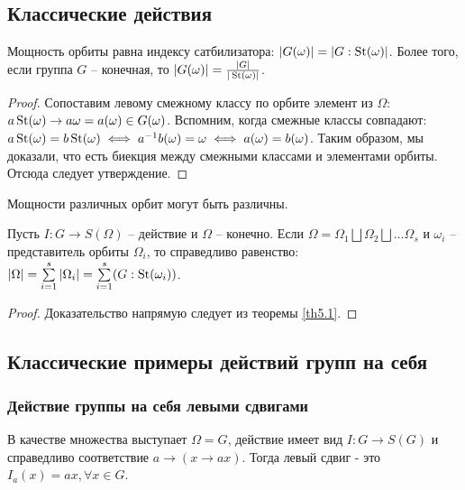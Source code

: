 \subsection{Классические действия}
\begin{theorem}
\label{th5.1}
    Мощность орбиты равна индексу сатбилизатора: $|G(\omega)| = |G: \operatorname{\text{St}}(\omega)|$. Более того, если группа $G$ -- конечная, то $|G(\omega)| = \frac{|G|}{|\operatorname{\text{St}}(\omega)|}$.
\end{theorem}

\begin{proof}
    Сопоставим левому смежному классу по орбите элемент из $\Omega$: $a\operatorname{\text{St}}(\omega) \to a\omega = a(\omega) \in G(\omega)$. Вспомним, когда смежные классы совпадают: $a\operatorname{\text{St}}(\omega) = b\operatorname{\text{St}}(\omega) \iff a^{-1}b(\omega) = \omega \iff a(\omega) = b(\omega)$. Таким образом, мы доказали, что есть биекция между смежными классами и элементами орбиты. Отсюда следует утверждение.
\end{proof}

\begin{note}
    Мощности различных орбит могут быть различны.
\end{note}

\begin{proposition}
\label{orbit_form}
    Пусть $I: G \to S(\Omega)$ -- действие и $\Omega$ -- конечно. Если $\Omega = \Omega_1 \bigsqcup \Omega_2 \bigsqcup \dots \Omega_s$ и $\omega_i$ -- представитель орбиты $\Omega_i$, то справедливо равенство: \\ $|\Omega| = \sum\limits_{i = 1}^s |\Omega_i| = \sum\limits_{i = 1}^s (G : \operatorname{\text{St}}(\omega_i))$.
\end{proposition}

\begin{proof}
    Доказательство напрямую следует из теоремы \ref{th5.1}.
\end{proof}

\subsection{Классические примеры действий групп на себя}
\subsubsection{Действие группы на себя левыми сдвигами}
\begin{definition}
    В качестве множества выступает $\Omega = G$, действие имеет вид $I: G \to S(G)$ и справедливо соответствие $a \to (x \to ax)$. Тогда левый сдвиг - это $I_a(x) = ax, \forall x \in G$.
\end{definition}

